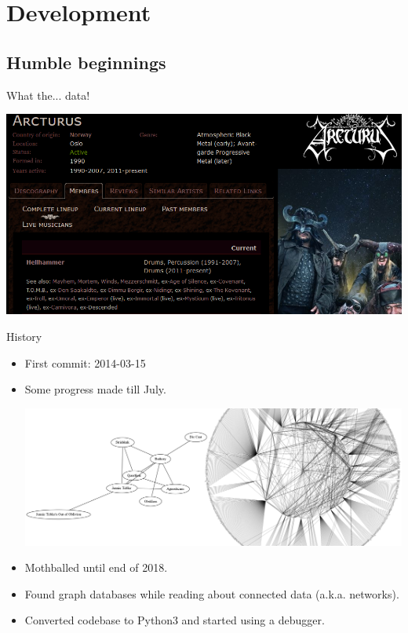 \documentclass{beamer}
\begin{document}
\section{Development}

  \subsection{Humble beginnings}

    \begin{frame}{What the... data!}
    
      \begin{center}
        \includegraphics[scale=.55]{MA_Arcturus}
      \end{center}
    
    \end{frame}

    \begin{frame}{History}

      \begin{itemize}

        \item<1-> First commit: 2014-03-15
        \item<1-> Some progress made till July.
          \begin{center}
            \includegraphics[scale=.6]{bandsGraphCombined}
          \end{center}
        \item<2-> Mothballed until end of 2018.
        \item<2-> Found graph databases while reading about connected data
          (a.k.a. networks).
        \item<2-> Converted codebase to Python3 and started using a debugger.
      \end{itemize}

    \end{frame}
\end{document}
